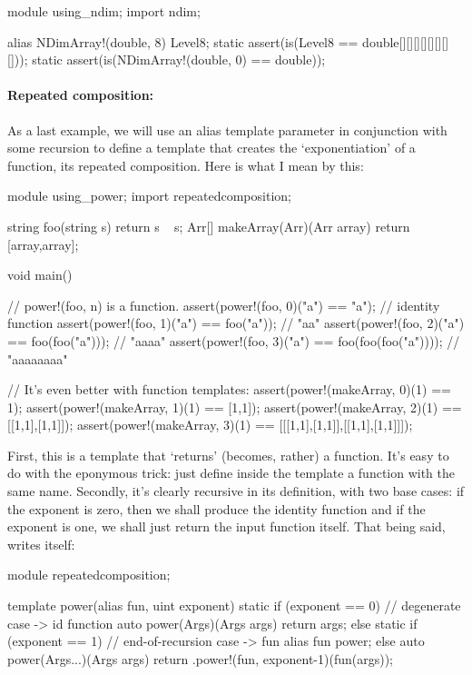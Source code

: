 \begin{dcode}
module using_ndim;
import ndim;

alias NDimArray!(double, 8) Level8;
static assert(is(Level8 == double[][][][][][][][]));
static assert(is(NDimArray!(double, 0) == double));
\end{dcode}

\paragraph{Repeated composition:} 

As a last example, we will use an alias template parameter in conjunction with some  recursion to define a template that creates the `exponentiation' of a function, its repeated composition. Here is what I mean by this:

\begin{dcode}
module using_power;
import repeatedcomposition;

string foo(string s) { return s ~ s;}
Arr[] makeArray(Arr)(Arr array) { return [array,array];}

void main()
{
   // power!(foo, n) is a function.
   assert(power!(foo, 0)("a") == "a");                // identity function
   assert(power!(foo, 1)("a") == foo("a"));           // "aa"
   assert(power!(foo, 2)("a") == foo(foo("a")));      // "aaaa"
   assert(power!(foo, 3)("a") == foo(foo(foo("a")))); // "aaaaaaaa"
	
   // It's even better with function templates:
   assert(power!(makeArray, 0)(1) == 1);
   assert(power!(makeArray, 1)(1) == [1,1]);
   assert(power!(makeArray, 2)(1) == [[1,1],[1,1]]);
   assert(power!(makeArray, 3)(1) == [[[1,1],[1,1]],[[1,1],[1,1]]]);
}
\end{dcode}

First, this is a template that `returns' (becomes, rather) a function. It's easy to do with the eponymous trick: just define inside the template a function with the same name. Secondly, it's clearly recursive in its definition, with two base cases: if the exponent is zero, then we shall produce the identity function and if the exponent is one, we shall just return the input function itself. That being said,  writes itself:

\begin{ndcode}
module repeatedcomposition;

template power(alias fun, uint exponent)
{
    static if (exponent == 0) // degenerate case -> id function
        auto power(Args)(Args args) { return args; }
    else static if (exponent == 1) // end-of-recursion case -> fun
        alias fun power;
    else
        auto power(Args...)(Args args) 
        {
            return .power!(fun, exponent-1)(fun(args));
        }
}
\end{ndcode}


